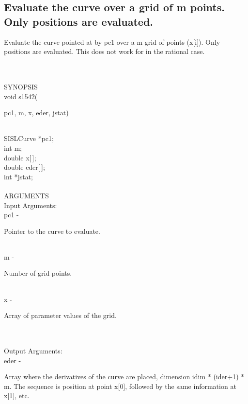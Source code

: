 \subsection{Evaluate the curve over a grid of m points.  Only positions are evaluated.}
\begin{minipg1}
Evaluate the curve pointed at by pc1 over a m grid
               of points (x[i]). Only positions are evaluated.
               This does not work for in the rational case.
\end{minipg1} \\ \\
SYNOPSIS\\
        \> void s1542(\begin{minipg3}
            {\fov pc1}, {\fov m}, {\fov x}, {\fov eder}, {\fov jstat})
                \end{minipg3}\\
                \>\>    SISLCurve \> *{\fov pc1};\\
                \>\>    int    \>  {\fov m};\\
                \>\>    double    \>  {\fov x}[\,];\\
                \>\>    double    \>  {\fov eder}[\,];\\
                \>\>    int    \>  *{\fov jstat};\\
\\
ARGUMENTS\\
	\>Input Arguments:\\
        \>\>    {\fov pc1}\> - \>  \begin{minipg2}
                     Pointer to the curve to evaluate.
                               \end{minipg2}\\
        \>\>    {\fov m}\> - \>  \begin{minipg2}
                     Number of grid points.
                               \end{minipg2}\\
        \>\>    {\fov x}\> - \>  \begin{minipg2}
                     Array of parameter values of the grid.
                               \end{minipg2}\\
\\
	\>Output Arguments:\\
        \>\>    {\fov eder}\> - \>  \begin{minipg2}
                     Array where the derivatives of the curve
                       are placed, dimension
                         idim * (ider+1) * m.
                       The sequence is position at point x[0],
                       followed by the same information at x[1],
                       etc.
                               \end{minipg2}\\
